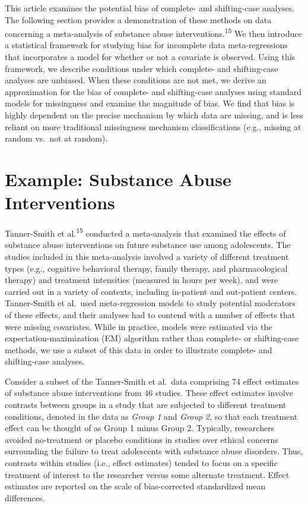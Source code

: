 \documentclass[
]{article}
\begin{document}
This article examines the potential bias of complete- and shifting-case analyses.
The following section provides a demonstration of these methods on data concerning a meta-analysis of substance abuse interventions.\textsuperscript{15}
We then introduce a statistical framework for studying bias for incomplete data meta-regressions that incorporates a model for whether or not a covariate is observed.
Using this framework, we describe conditions under which complete- and shifting-case analyses are unbiased.
When these conditions are not met, we derive an approximation for the bias of complete- and shifting-case analyses using standard models for missingness and examine the magnitude of bias.
We find that bias is highly dependent on the precise mechanism by which data are missing, and is less reliant on more traditional missingness mechanism classifications (e.g., missing at random vs.~not at random).

\hypertarget{example-substance-abuse-interventions}{%
\section{Example: Substance Abuse Interventions}\label{example-substance-abuse-interventions}}

Tanner-Smith et al.\textsuperscript{15} conducted a meta-analysis that examined the effects of substance abuse interventions on future substance use among adolescents.
The studies included in this meta-analysis involved a variety of different treatment types (e.g., cognitive behavioral therapy, family therapy, and pharmacological therapy) and treatment intensities (measured in hours per week), and were carried out in a variety of contexts, including in-patient and out-patient centers.
Tanner-Smith et al.~used meta-regression models to study potential moderators of these effects, and their analyses had to contend with a number of effects that were missing covariates.
While in practice, models were estimated via the expectation-maximization (EM) algorithm rather than complete- or shifting-case methods, we use a subset of this data in order to illustrate complete- and shifting-case analyses.

Consider a subset of the Tanner-Smith et al.~data comprising 74 effect estimates of substance abuse interventions from 46 studies.
These effect estimates involve contrasts between groups in a study that are subjected to different treatment conditions, denoted in the data as \emph{Group 1} and \emph{Group 2}, so that each treatment effect can be thought of as Group 1 minus Group 2.
Typically, researchers avoided no-treatment or placebo conditions in studies over ethical concerns surrounding the failure to treat adolescents with substance abuse disorders.
Thus, contrasts within studies (i.e., effect estimates) tended to focus on a specific treatment of interest to the researcher versus some alternate treatment.
Effect estimates are reported on the scale of bias-corrected standardized mean differences.
\end{document}
